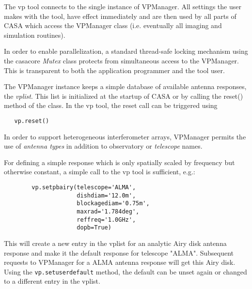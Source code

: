 \documentclass[12pt]{article}
\begin{document}
The vp tool connects to the single instance of VPManager.
All settings the user makes with the tool, have effect immediately and are then used
by all parts of CASA which access the VPManager class (i.e. eventually all imaging and simulation
routines).

In order to enable parallelization, a standard thread-safe locking mechanism using
the casacore {\it Mutex} class protects from simultaneous access
to the VPManager. This is transparent to both the application programmer and the tool user.

The VPManager instance keeps a simple database of available antenna responses, the {\it vplist}.
This list is initialized at the startup of CASA or by calling the reset() method
of the class. In the vp tool, the reset call can be triggered using
\begin{verbatim}
   vp.reset()
\end{verbatim}

In order to support heterogeneous interferometer arrays, VPManager permits the use
of {\it antenna types} in addition to observatory or {\it telescope} names.

For defining a simple response which is only spatially scaled by frequency but otherwise
constant, a simple call to the vp tool is sufficient, e.g.:
\begin{verbatim}
        vp.setpbairy(telescope='ALMA',
                     dishdiam='12.0m',
                     blockagediam='0.75m',
                     maxrad='1.784deg',
                     reffreq='1.0GHz',
                     dopb=True)
\end{verbatim}
This will create a new entry in the vplist for an analytic Airy disk antenna response
and make it the default response for telescope "ALMA".
Subsequent requests to VPManager for a ALMA antenna response will get this Airy disk.
Using the {\tt vp.setuserdefault} method, the default can be unset again or changed
to a different entry in the vplist.
\end{document}
